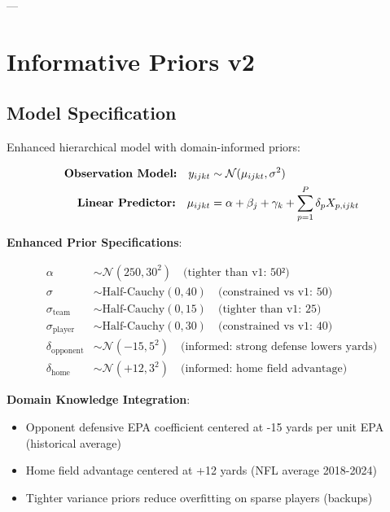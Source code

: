 ---

\section{Informative Priors v2}

\subsection{Model Specification}

Enhanced hierarchical model with domain-informed priors:

\begin{align}
\text{\textbf{Observation Model:}} \quad y_{ijkt} &\sim \mathcal{N}(\mu_{ijkt}, \sigma^2) \\
\text{\textbf{Linear Predictor:}} \quad \mu_{ijkt} &= \alpha + \beta_j + \gamma_k + \sum_{p=1}^{P} \delta_p X_{p,ijkt}
\label{eq:informative-priors-spec}
\end{align}

\textbf{Enhanced Prior Specifications}:

\begin{align}
\alpha &\sim \mathcal{N}(250, 30^2) \quad \text{(tighter than v1: 50²)} \\
\sigma &\sim \text{Half-Cauchy}(0, 40) \quad \text{(constrained vs v1: 50)} \\
\sigma_{\text{team}} &\sim \text{Half-Cauchy}(0, 15) \quad \text{(tighter than v1: 25)} \\
\sigma_{\text{player}} &\sim \text{Half-Cauchy}(0, 30) \quad \text{(constrained vs v1: 40)} \\
\delta_{\text{opponent}} &\sim \mathcal{N}(-15, 5^2) \quad \text{(informed: strong defense lowers yards)} \\
\delta_{\text{home}} &\sim \mathcal{N}(+12, 3^2) \quad \text{(informed: home field advantage)}
\label{eq:informative-priors-enhanced}
\end{align}

\textbf{Domain Knowledge Integration}:
\begin{itemize}
\item Opponent defensive EPA coefficient centered at -15 yards per unit EPA (historical average)
\item Home field advantage centered at +12 yards (NFL average 2018-2024)
\item Tighter variance priors reduce overfitting on sparse players (backups)
\end{itemize}

